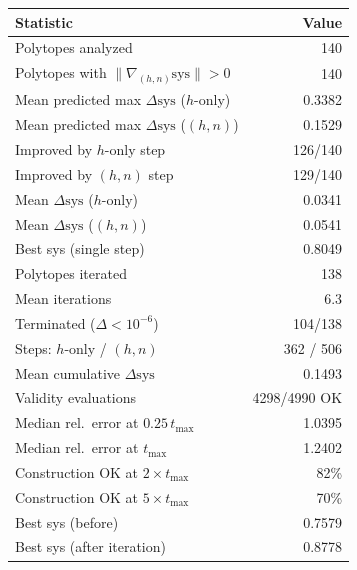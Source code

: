 \begin{tabular}{lr}
\toprule
Statistic & Value \\
\midrule
Polytopes analyzed & 140 \\
Polytopes with $\|\nabla_{(h,n)} \mathrm{sys}\| > 0$ & 140 \\
\midrule
Mean predicted max $\Delta\mathrm{sys}$ ($h$-only) & 0.3382 \\
Mean predicted max $\Delta\mathrm{sys}$ ($(h,n)$) & 0.1529 \\
\midrule
Improved by $h$-only step & 126/140 \\
Improved by $(h,n)$ step & 129/140 \\
Mean $\Delta\mathrm{sys}$ ($h$-only) & 0.0341 \\
Mean $\Delta\mathrm{sys}$ ($(h,n)$) & 0.0541 \\
Best sys (single step) & 0.8049 \\
\midrule
Polytopes iterated & 138 \\
Mean iterations & 6.3 \\
Terminated ($\Delta < 10^{-6}$) & 104/138 \\
Steps: $h$-only / $(h,n)$ & 362 / 506 \\
Mean cumulative $\Delta\mathrm{sys}$ & 0.1493 \\
\midrule
Validity evaluations & 4298/4990 OK \\
Median rel.\ error at $0.25\,t_{\max}$ & 1.0395 \\
Median rel.\ error at $t_{\max}$ & 1.2402 \\
Construction OK at $2\times t_{\max}$ & 82\% \\
Construction OK at $5\times t_{\max}$ & 70\% \\
\midrule
Best sys (before) & 0.7579 \\
Best sys (after iteration) & 0.8778 \\
\bottomrule
\end{tabular}
